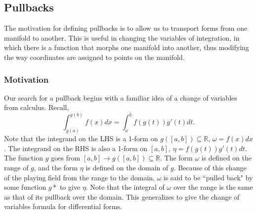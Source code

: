 \documentclass{article}
\begin{document}
\subsection{Pullbacks}
The motivation for defining pullbacks is to allow us to transport forms from one manifold to another. This is useful in changing the variables of integration, in which there is a function that morphs one manifold into another, thus modifying the way coordinates are assigned to points on the manifold.

\subsubsection{Motivation}
Our search for a pullback begins with a familiar idea of a change of variables from calculus. Recall,
\[
    \int_{g(a)}^{g(b)} f(x) dx = \int_a^b f(g(t)) g'(t) dt .
\]
Note that the integrand on the LHS is a 1-form on $g([a, b]) \subseteq \mathbb{R}$, $\omega = f(x) dx$. The integrand on the RHS is also a 1-form on $[a, b]$, $\eta = f(g(t)) g'(t) dt$. The function $g$ goes from $[a, b] \to g([a, b]) \subseteq \mathbb{R}$. The form $\omega$ is defined on the range of $g$, and the form $\eta$ is defined on the domain of $g$. Because of this change of the playing field from the range to the domain, $\omega$ is said to be ``pulled back" by some function $g*$ to give $\eta$. Note that the integral of $\omega$ over the range is the same as that of its pullback over the domain. This generalizes to give the change of variables formula for differential forms.
\end{document}

